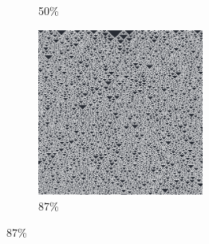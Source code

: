\documentclass[12pt, fleqn]{report}                             %
\theoremstyle{break}                                            %
\begin{document}
\begin{figure}[ht!]
\begin{subfigure}[b]{0.4\linewidth}
          \caption{50\%}
        \end{subfigure}
        \begin{subfigure}[b]{0.4\linewidth}
          \includegraphics[width=0.6\textwidth]{Images/122/d.png}
          \caption{87\%}
        \end{subfigure}
      \end{figure}
\end{document}
